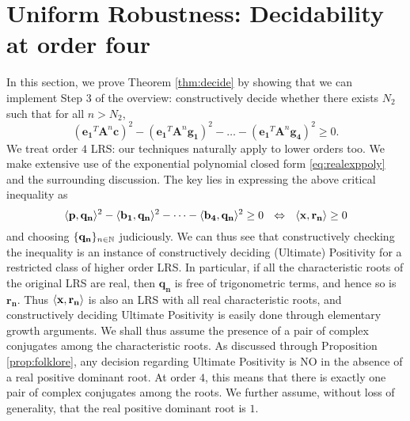 \section{Uniform Robustness: Decidability at order four}
\label{section:decidability}

  \label{thm:abelian}

In this section, we prove Theorem \ref{thm:decide} by showing that we can implement Step 3 of the overview: constructively decide whether there exists $N_2$ such that for all $n > N_2$,
\begin{equation}
\label{eq:criticalcopy}
(\mathbf{e_1}^T \mathbf{A}^n \mathbf{c})^2 - (\mathbf{e_1}^T \mathbf{A}^n \mathbf{g_1})^2 - \dots - (\mathbf{e_1}^T \mathbf{A}^n \mathbf{g_4})^2 \ge 0.
\end{equation}
We treat order $4$ LRS: our techniques naturally apply to lower orders too. We make extensive use of the exponential polynomial closed form \ref{eq:realexppoly} and the surrounding discussion. The key lies in expressing the above critical inequality as
\begin{equation}
\langle\mathbf{p}, \mathbf{q_n}\rangle^2 - \langle\mathbf{b_1}, \mathbf{q_n}\rangle^2 - \dots - \langle\mathbf{b_4}, \mathbf{q_n}\rangle^2 \ge 0 ~~\Leftrightarrow~~ \langle\mathbf{x}, \mathbf{r_n}\rangle \ge 0
\end{equation} 
and choosing $\{\mathbf{q_n}\}_{n\in\mathbb{N}}$ judiciously. We can thus see that constructively checking the inequality is an instance of constructively deciding (Ultimate) Positivity for a restricted class of higher order LRS. In particular, if all the characteristic roots of the original LRS are real, then $\mathbf{q_n}$ is free of trigonometric terms, and hence so is $\mathbf{r_n}$. Thus $\langle\mathbf{x}, \mathbf{r_n}\rangle$ is also an LRS with all real characteristic roots, and constructively deciding Ultimate Positivity is easily done through elementary growth arguments. We shall thus assume the presence of a pair of complex conjugates among the characteristic roots. As discussed through Proposition \ref{prop:folklore}, any decision regarding Ultimate Positivity is NO in the absence of a real positive dominant root. At order $4$, this means that there is exactly one pair of complex conjugates among the roots. We further assume, without loss of generality, that the real positive dominant root is $1$. 

